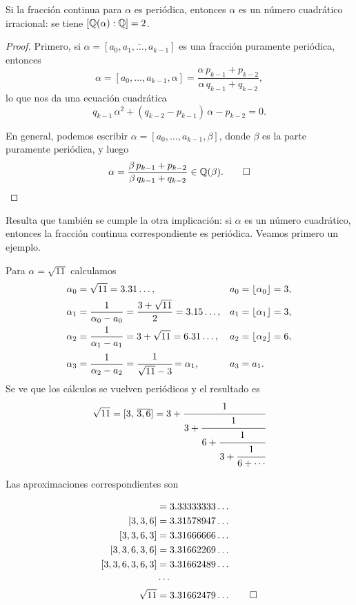 \begin{proposicion}
  \label{prop:fraccion-periodica=>cuadratico}
  Si la fracción continua para $\alpha$ es periódica, entonces $\alpha$ es un
  número cuadrático irracional: se tiene $[\mathbb{Q} (\alpha) : \mathbb{Q}] = 2$.

  \begin{proof}
    Primero, si $\alpha = [\overline{a_0,a_1,\ldots,a_{k-1}}]$ es una fracción
    puramente periódica, entonces
    $$\alpha = [a_0,\ldots,a_{k-1},\alpha] = \frac{\alpha\,p_{k-1} + p_{k-2}}{\alpha\,q_{k-1} + q_{k-2}},$$
    lo que nos da una ecuación cuadrática
    $$q_{k-1}\,\alpha^2 + (q_{k-2} - p_{k-1})\,\alpha - p_{k-2} = 0.$$

    En general, podemos escribir $\alpha = [a_0,\ldots,a_{k-1},\beta]$, donde
    $\beta$ es la parte puramente periódica, y luego
    \[ \alpha = \frac{\beta\,p_{k-1} + p_{k-2}}{\beta\,q_{k-1} + q_{k-2}} \in \mathbb{Q} (\beta). \qedhere \]
  \end{proof}
\end{proposicion}

Resulta que también se cumple la otra implicación: si $\alpha$ es un número
cuadrático, entonces la fracción continua correspondiente es periódica.
Veamos primero un ejemplo.

\begin{ejemplo}
  Para $\alpha = \sqrt{11}$ calculamos
  \begin{align*}
    \alpha_0 & = \sqrt{11} = 3.31\ldots, & a_0 & = \lfloor \alpha_0\rfloor = 3,\\
    \alpha_1 & = \frac{1}{\alpha_0 - a_0} = \frac{3 + \sqrt{11}}{2} = 3.15\ldots, & a_1 & = \lfloor \alpha_1\rfloor = 3,\\
    \alpha_2 & = \frac{1}{\alpha_1 - a_1} = 3 + \sqrt{11} = 6.31\ldots, & a_2 & = \lfloor \alpha_2\rfloor = 6,\\
    \alpha_3 & = \frac{1}{\alpha_2 - a_2} = \cfrac{1}{\sqrt{11} - 3} = \alpha_1, & a_3 & = a_1.
  \end{align*}
  Se ve que los cálculos se vuelven periódicos y el resultado es
  $$\sqrt{11} = [3, \, \overline{3,6}] = 3 + \cfrac{1}{3 + \cfrac{1}{6 + \cfrac{1}{3 + \cfrac{1}{6 + \cdots}}}}$$

  Las aproximaciones correspondientes son

  \begin{align*}
              [3,3] & = 3.33333333\ldots\\
            [3,3,6] & = 3.31578947\ldots\\
          [3,3,6,3] & = 3.31666666\ldots\\
        [3,3,6,3,6] & = 3.31662269\ldots\\
      [3,3,6,3,6,3] & = 3.31662489\ldots\\
                    & \cdots \\  
          \sqrt{11} & = 3.31662479\ldots \qedhere
  \end{align*}
\end{ejemplo}

